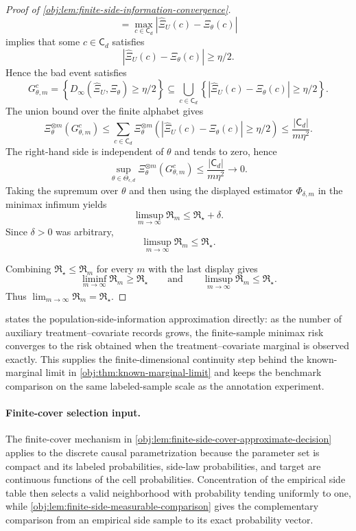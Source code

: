 \documentclass[11pt]{article}
\begin{document}
\begin{proof}[Proof of \cref{obj:lem:finite-side-information-convergence}]
\[=
\max_{c\in\mathsf C_d}
\left|\widehat\Xi_U(c)-\Xi_\theta(c)\right|
\]
implies that some \(c\in\mathsf C_d\) satisfies
\[
\left|\widehat\Xi_U(c)-\Xi_\theta(c)\right|
\ge \eta/2 .
\]
Hence the bad event satisfies
\[
G_{\theta,m}^c
=
\left\{D_\infty(\widehat\Xi_U,\Xi_\theta)\ge\eta/2\right\}
\subseteq
\bigcup_{c\in\mathsf C_d}
\left\{
\left|\widehat\Xi_U(c)-\Xi_\theta(c)\right|
\ge \eta/2
\right\}.
\]
The union bound over the finite alphabet gives
\[
\Xi_\theta^{\otimes m}(G_{\theta,m}^{c})
\le
\sum_{c\in\mathsf C_d}
\Xi_\theta^{\otimes m}\left(
\left|\widehat\Xi_U(c)-\Xi_\theta(c)\right|
\ge \eta/2
\right)
\le
\frac{|\mathsf C_d|}{m\eta^2} .
\]
The right-hand side is independent of \(\theta\) and tends to zero, hence
\[
\sup_{\theta\in\Theta_{\epsilon,d}}
\Xi_\theta^{\otimes m}(G_{\theta,m}^{c})
\le
\frac{|\mathsf C_d|}{m\eta^2}
\longrightarrow0 .
\]
Taking the supremum over \(\theta\) and then using the displayed estimator
\(\Phi_{\delta,m}\) in the minimax infimum yields
\[
\limsup_{m\to\infty}\mathfrak R_m\le \mathfrak R_\star+\delta .
\]
Since \(\delta>0\) was arbitrary,
\[
\limsup_{m\to\infty}\mathfrak R_m\le \mathfrak R_\star .
\]

Combining \(\mathfrak R_\star\le\mathfrak R_m\) for every \(m\) with the last display gives
\[
\liminf_{m\to\infty}\mathfrak R_m\ge\mathfrak R_\star
\qquad\text{and}\qquad
\limsup_{m\to\infty}\mathfrak R_m\le\mathfrak R_\star .
\]
Thus \(\lim_{m\to\infty}\mathfrak R_m=\mathfrak R_\star\). %
\end{proof}

 states the population-side-information approximation directly: as the number of auxiliary treatment--covariate records grows, the finite-sample minimax risk converges to the risk obtained when the treatment--covariate marginal is observed exactly. This supplies the finite-dimensional continuity step behind the known-marginal limit in \cref{obj:thm:known-marginal-limit} and keeps the benchmark comparison on the same labeled-sample scale as the annotation experiment.

\paragraph{Finite-cover selection input.}
The finite-cover mechanism in \cref{obj:lem:finite-side-cover-approximate-decision} applies to the discrete causal parametrization because the parameter set is compact and its labeled probabilities, side-law probabilities, and target are continuous functions of the cell probabilities. Concentration of the empirical side table then selects a valid neighborhood with probability tending uniformly to one, while \cref{obj:lem:finite-side-measurable-comparison} gives the complementary comparison from an empirical side sample to its exact probability vector.
\end{document}

